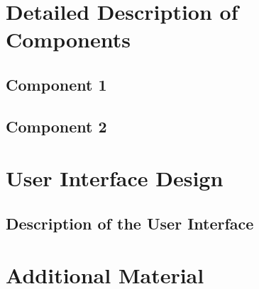 \documentclass{article}[12pt,a4]
\begin{document}
\section{Detailed Description of Components}

\subsection{Component 1}

\subsection{Component 2}


\section{User Interface Design}

\subsection{Description of the User Interface}


\section{Additional Material}
\end{document}
